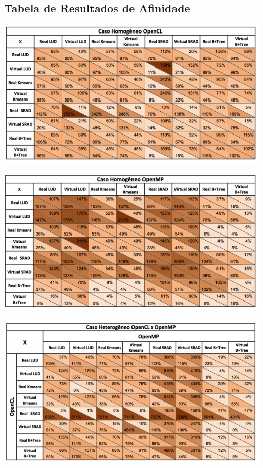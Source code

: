 \begin{anexosenv}

\partanexos

\chapter{Tabela de Resultados de Afinidade}


\includegraphics[width=1\textwidth]{resultado1.png}

\includegraphics[width=1\textwidth]{resultado2.png}

\includegraphics[width=1\textwidth]{resultado3.png}


\end{anexosenv}

